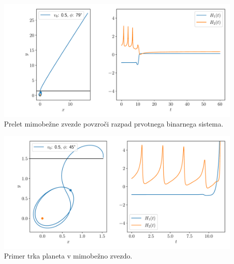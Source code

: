 \begin{center}
    \includegraphics[width=0.9\textwidth]{../images/3-1-7.pdf}\\
    Prelet mimobežne zvezde povzroči razpad prvotnega binarnega sistema.
\end{center}
\begin{center}
    \includegraphics[width=0.9\textwidth]{../images/3-1-4.pdf}\\
    Primer trka planeta v mimobežno zvezdo.
\end{center}

